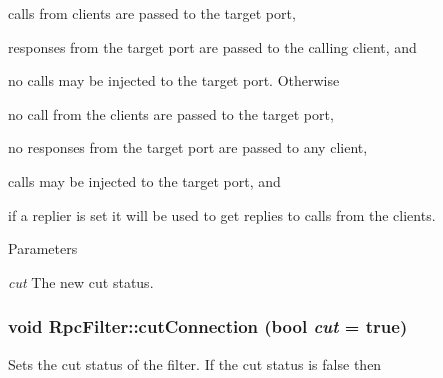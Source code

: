 \begin{DoxyItemize}
\item calls from clients are passed to the target port,
\item responses from the target port are passed to the calling client, and
\item no calls may be injected to the target port. Otherwise
\item no call from the clients are passed to the target port,
\item no responses from the target port are passed to any client,
\item calls may be injected to the target port, and
\item if a replier is set it will be used to get replies to calls from the clients. 
\begin{DoxyParams}{Parameters}
\item[{\em cut}]The new cut status. \end{DoxyParams}

\end{DoxyItemize}\hypertarget{classyarp_1_1os_1_1_rpc_filter_ae7a72f77f502c0872a3efb87cffb17e4}{
\subsubsection[{cutConnection}]{\setlength{\rightskip}{0pt plus 5cm}void RpcFilter::cutConnection (bool {\em cut} = {\ttfamily true})}}
\label{classyarp_1_1os_1_1_rpc_filter_ae7a72f77f502c0872a3efb87cffb17e4}
Sets the cut status of the filter. If the cut status is {\ttfamily false} then
